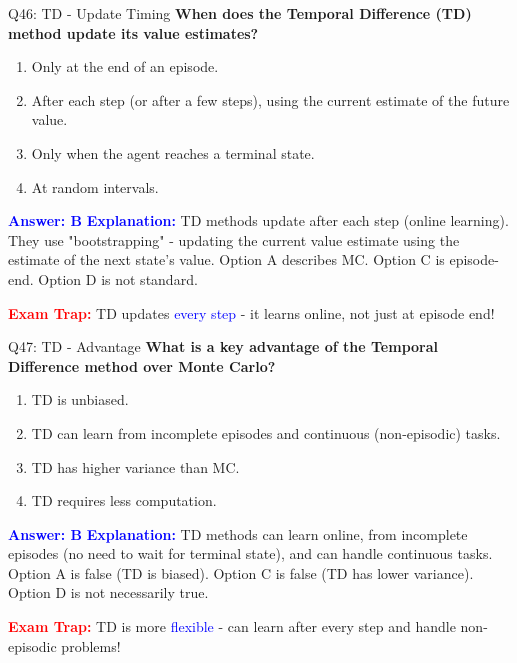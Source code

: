 \documentclass[8pt]{beamer}
\begin{document}
	\begin{frame}{Q46: TD - Update Timing}
		\fontsize{6.5}{7.5}\selectfont
		\textbf{When does the Temporal Difference (TD) method update its value estimates?}
		
		\begin{enumerate}
			\item Only at the end of an episode.
			\item After each step (or after a few steps), using the current estimate of the future value.
			\item Only when the agent reaches a terminal state.
			\item At random intervals.
		\end{enumerate}
		
		\vspace{0.1cm}
		\textcolor{blue}{\textbf{Answer: B}}
		\vspace{0.1cm}
		\textcolor{blue}{\textbf{Explanation:}} TD methods update after each step (online learning). They use "bootstrapping" - updating the current value estimate using the estimate of the next state's value. Option A describes MC. Option C is episode-end. Option D is not standard.
		
		\textcolor{red}{\textbf{Exam Trap:}} TD updates \textcolor{blue}{every step} - it learns online, not just at episode end!
	\end{frame}
	
	\begin{frame}{Q47: TD - Advantage}
		\fontsize{6.5}{7.5}\selectfont
		\textbf{What is a key advantage of the Temporal Difference method over Monte Carlo?}
		
		\begin{enumerate}
			\item TD is unbiased.
			\item TD can learn from incomplete episodes and continuous (non-episodic) tasks.
			\item TD has higher variance than MC.
			\item TD requires less computation.
		\end{enumerate}
		
		\vspace{0.1cm}
		\textcolor{blue}{\textbf{Answer: B}}
		\vspace{0.1cm}
		\textcolor{blue}{\textbf{Explanation:}} TD methods can learn online, from incomplete episodes (no need to wait for terminal state), and can handle continuous tasks. Option A is false (TD is biased). Option C is false (TD has lower variance). Option D is not necessarily true.
		
		\textcolor{red}{\textbf{Exam Trap:}} TD is more \textcolor{blue}{flexible} - can learn after every step and handle non-episodic problems!
	\end{frame}
	
\end{document}
